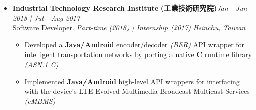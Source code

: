 \begin{itemize}[leftmargin=0pt, label={}]
\item{
{\sectionheading\large{\textbf{Industrial Technology Research Institute}}} \textbf{(工業技術研究院)}\hfill {\sectionheading\small{\textit{Jan - Jun 2018 | Jul - Aug 2017}}}\\
{\sectionheading\small{Software Developer. \textit{Part-time (2018) | Internship (2017)}}}\hfill
{\sectionheading\small{\textit{Hsinchu, Taiwan}}}

    \vspace{-6pt}
    \begin{itemize}[label=\textbullet, leftmargin=*, noitemsep]
        \item{Developed a \textbf{Java/Android} encoder/decoder \textit{(BER)} API wrapper for intelligent transportation networks by porting a native \textbf{C} runtime library \textit{(ASN.1 C)}}
        \item{Implemented \textbf{Java/Android} high-level API wrappers for interfacing with the device's LTE Evolved Multimedia Broadcast Multicast Services \textit{(eMBMS)}}
    \end{itemize}
}

% 


\end{itemize}
